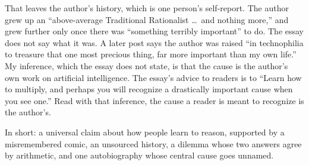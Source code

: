 \begin{afterword}
That leaves the author's history, which is one person's self-report. The author grew up an ``above-average Traditional Rationalist \ldots\ and nothing more,'' and grew further only once there was ``something terribly important'' to do. The essay does not say what it was. A later post says the author was raised ``in technophilia to treasure that one most precious thing, far more important than my own life.'' My inference, which the essay does not state, is that the cause is the author's own work on artificial intelligence. The essay's advice to readers is to ``Learn how to multiply, and perhaps you will recognize a drastically important cause when you see one.'' Read with that inference, the cause a reader is meant to recognize is the author's.

In short: a universal claim about how people learn to reason, supported by a misremembered comic, an unsourced history, a dilemma whose two answers agree by arithmetic, and one autobiography whose central cause goes unnamed.
\end{afterword}
